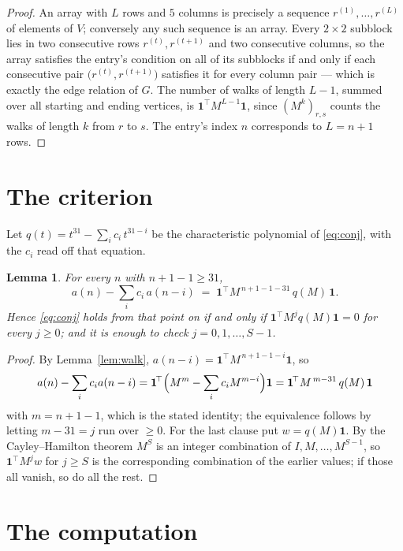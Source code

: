 \documentclass[11pt,a4paper]{article}
\theoremstyle{plain}
\newtheorem{lemma}[theorem]{Lemma}
\theoremstyle{definition}
\begin{document}
\begin{proof}
An array with $L$ rows and $5$ columns is precisely a sequence
$r^{(1)},\dots,r^{(L)}$ of elements of $V$; conversely any such sequence is an array.
Every $2\times2$ subblock lies in two consecutive rows $r^{(t)},r^{(t+1)}$ and two
consecutive columns, so the array satisfies the entry's condition on all of its subblocks
if and only if each consecutive pair $\bigl(r^{(t)},r^{(t+1)}\bigr)$ satisfies it for
every column pair --- which is exactly the edge relation of $G$. The number of walks of
length $L-1$, summed over all starting and ending vertices, is
$\mathbf{1}^{\!\top}M^{L-1}\mathbf{1}$, since $(M^{k})_{r,s}$ counts the walks of
length $k$ from $r$ to $s$. The entry's index $n$ corresponds to $L=n+1$ rows.
\end{proof}

\section{The criterion}

Let $q(t)=t^{31}-\sum_i c_i\,t^{31-i}$ be the characteristic polynomial of
\eqref{eq:conj}, with the $c_i$ read off that equation.

\begin{lemma}\label{lem:crit}
For every $n$ with $n+1-1\ge31$,
\[
a(n)-\sum_i c_i\,a(n-i)\;=\;\mathbf{1}^{\!\top}M^{\,n+1-1-31}\,q(M)\,\mathbf{1} .
\]
Hence \eqref{eq:conj} holds from that point on if and only if
$\mathbf{1}^{\!\top}M^{j}q(M)\mathbf{1}=0$ for every $j\ge0$; and it is enough to check
$j=0,1,\dots,S-1$.
\end{lemma}

\begin{proof}
By Lemma~\ref{lem:walk}, $a(n-i)=\mathbf{1}^{\!\top}M^{\,n+1-1-i}\mathbf{1}$, so
\[
a(n)-\sum_i c_i a(n-i)
=\mathbf{1}^{\!\top}\Bigl(M^{m}-\sum_i c_i M^{m-i}\Bigr)\mathbf{1}
=\mathbf{1}^{\!\top}M^{\,m-31}\,q(M)\,\mathbf{1}
\]
with $m=n+1-1$, which is the stated identity; the equivalence follows by letting
$m-31=j$ run over $\ge0$. For the last clause put $w=q(M)\mathbf{1}$. By the
Cayley--Hamilton theorem $M^{S}$ is an integer combination of $I,M,\dots,M^{S-1}$, so
$\mathbf{1}^{\!\top}M^{j}w$ for $j\ge S$ is the corresponding combination of the earlier
values; if those all vanish, so do all the rest.
\end{proof}

\section{The computation}
\end{document}
